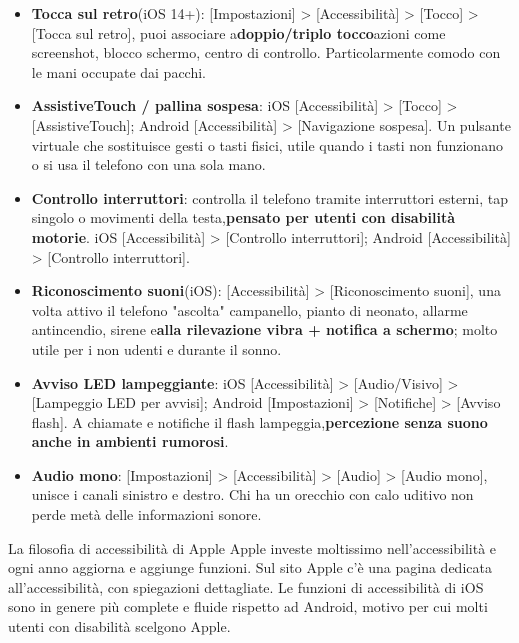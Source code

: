\begin{itemize}
  \item \textbf{Tocca sul retro}(iOS 14+): [Impostazioni] > [Accessibilità] > [Tocco] > [Tocca sul retro], puoi associare a\textbf{doppio/triplo tocco}azioni come screenshot, blocco schermo, centro di controllo. Particolarmente comodo con le mani occupate dai pacchi.
  \item \textbf{AssistiveTouch / pallina sospesa}: iOS [Accessibilità] > [Tocco] > [AssistiveTouch]; Android [Accessibilità] > [Navigazione sospesa]. Un pulsante virtuale che sostituisce gesti o tasti fisici, utile quando i tasti non funzionano o si usa il telefono con una sola mano.
  \item \textbf{Controllo interruttori}: controlla il telefono tramite interruttori esterni, tap singolo o movimenti della testa,\textbf{pensato per utenti con disabilità motorie}. iOS [Accessibilità] > [Controllo interruttori]; Android [Accessibilità] > [Controllo interruttori].
  \item \textbf{Riconoscimento suoni}(iOS): [Accessibilità] > [Riconoscimento suoni], una volta attivo il telefono "ascolta" campanello, pianto di neonato, allarme antincendio, sirene e\textbf{alla rilevazione vibra + notifica a schermo}; molto utile per i non udenti e durante il sonno.
  \item \textbf{Avviso LED lampeggiante}: iOS [Accessibilità] > [Audio/Visivo] > [Lampeggio LED per avvisi]; Android [Impostazioni] > [Notifiche] > [Avviso flash]. A chiamate e notifiche il flash lampeggia,\textbf{percezione senza suono anche in ambienti rumorosi}.
  \item \textbf{Audio mono}: [Impostazioni] > [Accessibilità] > [Audio] > [Audio mono], unisce i canali sinistro e destro. Chi ha un orecchio con calo uditivo non perde metà delle informazioni sonore.
\end{itemize}

\begin{tcbinfo}{La filosofia di accessibilità di Apple}
Apple investe moltissimo nell'accessibilità e ogni anno aggiorna e aggiunge funzioni. Sul sito Apple c'è una pagina dedicata all'accessibilità, con spiegazioni dettagliate. Le funzioni di accessibilità di iOS sono in genere più complete e fluide rispetto ad Android, motivo per cui molti utenti con disabilità scelgono Apple.

\end{tcbinfo}

